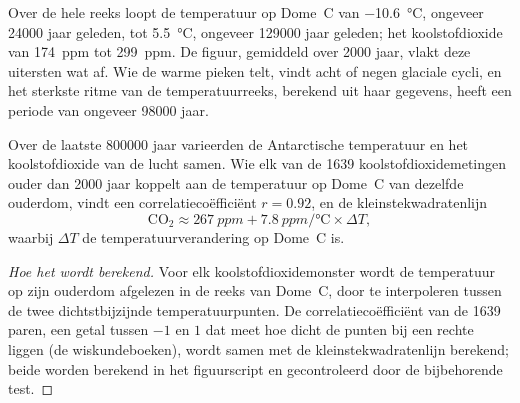 Over de hele reeks loopt de temperatuur op Dome~C van
\qty{-10.6}{\degreeCelsius}, ongeveer \num{24000} jaar geleden, tot
\qty{+5.5}{\degreeCelsius}, ongeveer \num{129000} jaar geleden; het koolstofdioxide
van \qty{174}{ppm} tot \qty{299}{ppm}. De figuur, gemiddeld over \num{2000}
jaar, vlakt deze uitersten wat af. Wie de warme pieken telt, vindt acht
of negen glaciale cycli, en het sterkste ritme van de temperatuurreeks,
berekend uit haar gegevens, heeft een periode van ongeveer \num{98000} jaar.

\begin{proposition}\label{prop:g12:past-climates:correlation}
Over de laatste \num{800000} jaar varieerden de Antarctische temperatuur en het
koolstofdioxide van de lucht samen. Wie elk van de 1639 koolstofdioxidemetingen
ouder dan \num{2000} jaar koppelt aan de temperatuur op Dome~C van
dezelfde ouderdom, vindt een correlatiecoëfficiënt $r = 0.92$, en de
kleinstekwadratenlijn
\[
  \mathrm{CO_2} \approx \qty{267}{ppm} + \qty{7.8}{ppm/\degreeCelsius} \times \Delta T ,
\]
waarbij $\Delta T$ de temperatuurverandering op Dome~C is.
\end{proposition}

\begin{proof}[Hoe het wordt berekend]
Voor elk koolstofdioxidemonster wordt de temperatuur op zijn ouderdom afgelezen in de
reeks van Dome~C, door te interpoleren tussen de twee dichtstbijzijnde temperatuurpunten.
De correlatiecoëfficiënt van de 1639 paren, een getal tussen $-1$ en $1$
dat meet hoe dicht de punten bij een rechte liggen (de wiskundeboeken),
wordt samen met de kleinstekwadratenlijn berekend; beide worden berekend in het
figuurscript en gecontroleerd door de bijbehorende test.
\end{proof}

